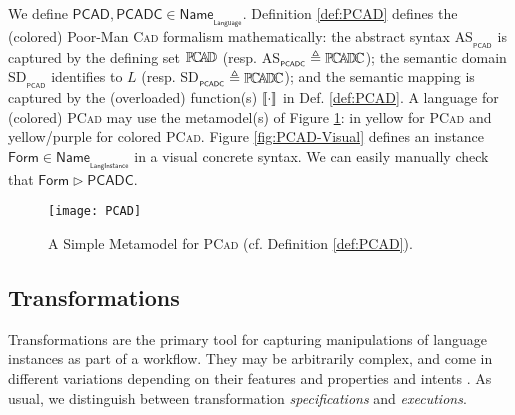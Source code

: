 \begin{Example}
      We define $\mathsf{PCAD, PCADC} \in 
\mathsf{Name}_{_{\mathsf{Language}}}$. Definition \ref{def:PCAD} defines the 
(colored) Poor-Man \textsc{Cad} formalism mathematically: the abstract syntax 
\textsf{AS}$_{_{\mathsf{PCAD}}}$ is captured by the defining set $\mathbb{P}\!\mathbb{C}\!\mathbb{A}\!\mathbb{D} $ (resp. 
\textsf{AS}$_{_{\mathsf{PCADC}}} \triangleq \mathbb{P}\!\mathbb{C}\!\mathbb{A}\!\mathbb{D} \!\mathbb{C} $); the semantic domain 
\textsf{SD}$_{_{\mathsf{PCAD}}}$ identifies to $L$ (resp. 
\textsf{SD}$_{_{\mathsf{PCADC}}} \triangleq \mathbb{P}\!\mathbb{C}\!\mathbb{A}\!\mathbb{D} \!\mathbb{C} $); and the semantic mapping is 
captured by the (overloaded) function(s) $\llbracket \cdot \rrbracket$ in Def. \ref{def:PCAD}. A 
language for (colored) \textsc{PCad} may use the metamodel(s) of Figure 
\ref{fig:PCAD-MM}: in yellow for \textsc{PCad} and yellow/purple for colored 
\textsc{PCad}. Figure \ref{fig:PCAD-Visual} defines an instance 
$\mathsf{Form}\in\mathsf{Name}_{_{\mathsf{LangInstance}}}$ in a visual concrete 
syntax. We can easily manually check that $\mathsf{Form}\rhd \mathsf{PCADC}$.

\begin{figure}[t]
   \centering
   \texttt{[image: PCAD]}
   \caption{A Simple Metamodel for \textsc{PCad} (cf. Definition 
\ref{def:PCAD}).}%
   \label{fig:PCAD-MM}%
\end{figure}
\end{Example}



\subsection{Transformations}
\label{sec:Formalisation-Transformation}

Transformations are the primary tool for capturing manipulations of language 
instances as part of a workflow. They may be arbitrarily complex, and come in 
different variations depending on their features \cite{J:Mens-VonGorp:2006} and 
properties and intents \cite{J:Lucio-Amrani-etAl:2014}. As usual, we 
distinguish between transformation \emph{specifications} and \emph{executions}.

